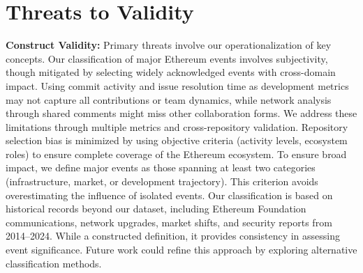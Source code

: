 \section{Threats to Validity}
\label{threats}

\textbf{Construct Validity:} Primary threats involve our operationalization of key concepts. Our classification of major Ethereum events involves subjectivity, though mitigated by selecting widely acknowledged events with cross-domain impact. Using commit activity and issue resolution time as development metrics may not capture all contributions or team dynamics, while network analysis through shared comments might miss other collaboration forms. We address these limitations through multiple metrics and cross-repository validation. Repository selection bias is minimized by using objective criteria (activity levels, ecosystem roles) to ensure complete coverage of the Ethereum ecosystem.
To ensure broad impact, we define major events as those spanning at least two categories (infrastructure, market, or development trajectory). This criterion avoids overestimating the influence of isolated events. Our classification is based on historical records beyond our dataset, including Ethereum Foundation communications, network upgrades, market shifts, and security reports from 2014–2024. While a constructed definition, it provides consistency in assessing event significance. Future work could refine this approach by exploring alternative classification methods.


